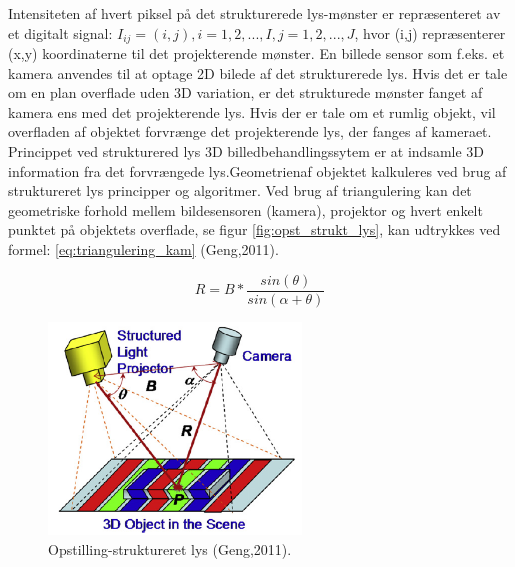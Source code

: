 Intensiteten af hvert piksel på det strukturerede lys-mønster er repræsenteret av et digitalt signal: $I_{ij}=(i,j),i=1,2,...,I,j=1,2,...,J$, hvor (i,j) repræsenterer (x,y) koordinaterne til det projekterende mønster.
En billede sensor som f.eks. et kamera anvendes til at optage 2D bilede af det strukturerede lys. Hvis det er tale om en plan overflade uden 3D variation, er det strukturede mønster fanget af kamera ens med det projekterende lys. Hvis der er tale om et rumlig objekt, vil overfladen af objektet forvrænge det projekterende lys, der fanges af kameraet. Princippet ved strukturered lys 3D billedbehandlingssytem er at indsamle 3D information fra det forvrængede lys.Geometrienaf objektet kalkuleres ved brug af struktureret lys principper og algoritmer. Ved brug af triangulering kan det geometriske forhold mellem bildesensoren (kamera), projektor og hvert enkelt punktet på objektets overflade, se figur \vref{fig:opst_strukt_lys}, kan udtrykkes ved formel: \vref{eq:triangulering_kam} (Geng,2011). 

%
\begin{equation}
R=B*\frac{sin(\theta)}{sin(\alpha+\theta)}
\label{eq:triangulering_kam}
\end{equation}
%



\begin{figure}
\centering
\includegraphics[width=0.6\textwidth]{Unavngivet}
\caption{Opstilling-struktureret lys (Geng,2011).}
\label{fig:opst_strukt_lys}
\end{figure}
  

% 

